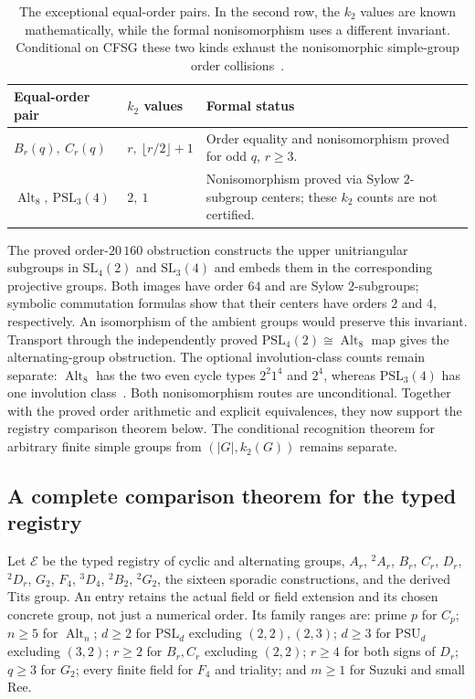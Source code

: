 \documentclass[11pt]{article}
\numberwithin{equation}{section}
\theoremstyle{definition}
\newcommand{\SL}{\mathrm{SL}}
\newcommand{\PSL}{\mathrm{PSL}}
\newcommand{\PSU}{\mathrm{PSU}}
\newcommand{\Alt}{\operatorname{Alt}}
\begin{document}
\begin{table}[!htbp]
\centering\small
\begin{tabularx}{\textwidth}{@{}l l X@{}}
\toprule
Equal-order pair & $k_2$ values & Formal status\\
\midrule
$B_r(q),\ C_r(q)$ & $r,\ \lfloor r/2\rfloor+1$ &
Order equality and nonisomorphism proved for odd $q$, $r\geq3$.\\
\addlinespace
$\Alt_8,\ \PSL_3(4)$ & $2,\ 1$ &
Nonisomorphism proved via Sylow $2$-subgroup centers;
these $k_2$ counts are not certified.\\
\bottomrule
\end{tabularx}
\caption{The exceptional equal-order pairs. In the second row, the
$k_2$ values are known mathematically, while the formal nonisomorphism
uses a different invariant. Conditional
on CFSG these two kinds exhaust the nonisomorphic simple-group
order collisions~\cite{OrderRecognition,Taylor,BorovikInvolutions}.}
\label{tab:noniso}
\end{table}

The proved order-$20\,160$ obstruction constructs the upper
unitriangular subgroups in $\SL_4(2)$ and $\SL_3(4)$ and embeds them
in the corresponding projective groups. Both images have order $64$
and are Sylow $2$-subgroups; symbolic commutation formulas show that
their centers have orders $2$ and $4$, respectively. An isomorphism
of the ambient groups would preserve this invariant. Transport through
the independently proved $\PSL_4(2)\cong\Alt_8$ map gives the
alternating-group obstruction.
The optional involution-class counts remain separate: $\Alt_8$ has
the two even cycle types $2^2 1^4$ and $2^4$, whereas $\PSL_3(4)$
has one involution class~\cite[Chapter~4]{Taylor}.
Both nonisomorphism routes are unconditional. Together with the proved
order arithmetic and explicit equivalences, they now support the
registry comparison theorem below. The conditional recognition theorem
for arbitrary finite simple groups from $(|G|,k_2(G))$ remains separate.

\subsection{A complete comparison theorem for the typed registry}
\label{sec:catalogue-comparison}

Let $\mathcal E$ be the typed registry of cyclic and alternating groups,
$A_r$, ${}^2A_r$, $B_r$, $C_r$, $D_r$, ${}^2D_r$, $G_2$, $F_4$,
${}^3D_4$, ${}^2B_2$, ${}^2G_2$, the sixteen sporadic constructions,
and the derived Tits group. An entry retains the actual field or field extension and its
chosen concrete group, not just a numerical order. Its family ranges
are: prime $p$ for $C_p$; $n\geq5$ for $\Alt_n$; $d\geq2$ for
$\PSL_d$ excluding $(2,2),(2,3)$; $d\geq3$ for $\PSU_d$ excluding
$(3,2)$; $r\geq2$ for $B_r,C_r$ excluding $(2,2)$; $r\geq4$ for
both signs of $D_r$; $q\geq3$ for $G_2$; every finite field for $F_4$
and triality; and $m\geq1$ for Suzuki and small Ree.
\end{document}
